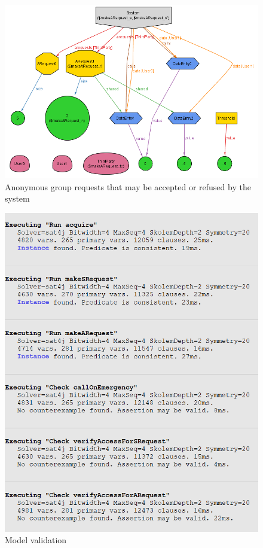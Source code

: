   \begin{figure}[h!]
    \centering
    \hspace*{-0cm}
    \includegraphics[width=\textwidth]{img/alloy/alloy_arequest.png}
    \caption{Anonymous group requests that may be accepted or refused by the system}
    \label{fig:alloy_arequest}
  \end{figure}

  \begin{figure}[h!]
    \centering
    \hspace*{-0cm}
    \includegraphics[width=\textwidth]{img/alloy/alloy_check.png}
    \caption{Model validation}
    \label{fig:alloy_check}
  \end{figure}
